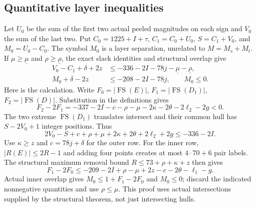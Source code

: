 \documentclass[11pt,letterpaper]{article}
\newcommand{\FS}{\operatorname{FS}}
\newcommand{\card}[1]{\lvert#1\rvert}
\theoremstyle{definition}\newtheorem{definition}[theorem]{Definition}
\begin{document}
\subsection{Quantitative layer inequalities}
Let $U_0$ be the sum of the first two actual peeled magnitudes on each
sign and $V_0$ the sum of the last two. Put $C_0=1225+I+\tau$,
$C_1=C_0+U_0$, $S=C_1+V_0$, and $M_0=U_0-C_0$.
The symbol $M_0$ is a layer separation, unrelated to $M=M_s+M_t$.
If $\mu\ge\underline\mu$ and $\rho\ge\underline\rho$, the exact
slack identities and structural overlap give
\begin{align}
V_0-C_1+\delta+2z
&\le-336-2I-78j-\underline\mu-\underline\rho,
\label{eq:common-outer-layer}\\
M_0+\delta-2z&\le-208-2I-78j,\qquad M_0\le0.
\label{eq:common-inner-layer}
\end{align}
Here is the calculation. Write $F_0=\card{\FS(E)}$,
$F_1=\card{\FS(D_1)}$, $F_2=\card{\FS(D)}$.
Substitution in the definitions gives
\[
F_2-2F_1=-337-2I-c-\rho-\mu-2\kappa-2\theta-2\ell_2-2g<0.
\]
The two extreme $\FS(D_1)$ translates intersect and their common
hull has $S-2V_0+1$ integer positions. Thus
\[
2V_0-S+c+\rho+\mu+2\kappa+2\theta+2\ell_2+2g\le-336-2I.
\]
Use $\kappa\ge z$ and $c=78j+\delta$ for the outer row.
For the inner row, $\card{R(E)}\le2R-1$ and adding four points
creates at most $4\cdot70+6$ pair labels. The structural maximum
removal bound $R\le73+\rho+\kappa+z$ then gives
\[
F_1-2F_0\le-209-2I+\rho-\mu+2z-c-2\theta-\ell_1-g.
\]
Actual inner overlap gives $M_0\le1+F_1-2F_0$ and $M_0\le0$;
discard the indicated nonnegative quantities and use $\rho\le\mu$.
This proof uses actual intersections supplied by the structural
theorem, not just intersecting hulls.
\end{document}
